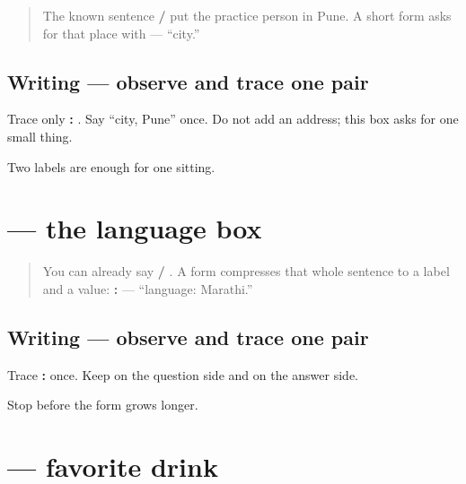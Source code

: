 \label{lesson:MR-A1F01-shahar}



\begin{quote}
The known sentence \textbf{   / } put the practice person in Pune. A short form asks for that place with \textbf{} — “city.”
\end{quote}

\subsection*{Writing — observe and trace one pair}
Trace only \textbf{: }. Say “city, Pune” once. Do not add an address; this box asks for one small thing.

\begin{tcolorbox}[breakable,colback=teal!4,colframe=teal!35!black,title={Before you move on}]
Two labels are enough for one sitting.
\end{tcolorbox}
\section[bhāṣā: marāṭhī]{ — the language box}

\label{lesson:MR-A1F01-bhasha}



\begin{quote}
You can already say \textbf{   / }. A form compresses that whole sentence to a label and a value: \textbf{: } — “language: Marathi.”
\end{quote}

\subsection*{Writing — observe and trace one pair}
Trace \textbf{: } once. Keep \textbf{} on the question side and \textbf{} on the answer side.

\begin{tcolorbox}[breakable,colback=teal!4,colframe=teal!35!black,title={Before you move on}]
Stop before the form grows longer.
\end{tcolorbox}
\section[āvaḍte pey: chahā]{  — favorite drink}


